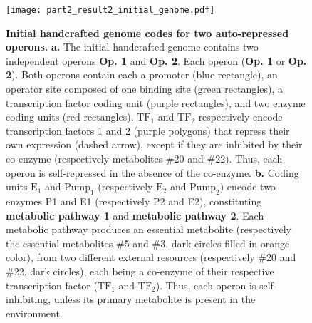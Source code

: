 \begin{figure}
\centering
\texttt{[image: part2\_result2\_initial\_genome.pdf]}
\caption[Initial handcrafted genome codes for two auto-repressed operons.]
{\textbf{Initial handcrafted genome codes for two auto-repressed operons.}
\textbf{a.} The initial handcrafted genome contains two independent operons \textbf{Op. 1} and \textbf{Op. 2}. Each operon (\textbf{Op. 1} or \textbf{Op. 2}). Both operons contain each a promoter (blue rectangle), an operator site composed of one binding site (green rectangles), a transcription factor coding unit (purple rectangles), and two enzyme coding units (red rectangles). $\text{TF}_1$ and $\text{TF}_2$ respectively encode transcription factors 1 and 2 (purple polygons) that repress their own expression (dashed arrow), except if they are inhibited by their co-enzyme (respectively metabolites \#20 and \#22). Thus, each operon is self-repressed in the absence of the co-enzyme.
\textbf{b.} Coding units $\text{E}_1$ and $\text{Pump}_1$ (respectively $\text{E}_2$ and $\text{Pump}_2$) encode two enzymes P1 and E1 (respectively P2 and E2), constituting \textbf{metabolic pathway 1} and \textbf{metabolic pathway 2}. Each metabolic pathway produces an essential metabolite (respectively the essential metabolites \#5 and \#3, dark circles filled in orange color), from two different external resources (respectively \#20 and \#22, dark circles), each being a co-enzyme of their respective transcription factor ($\text{TF}_1$ and $\text{TF}_2$). Thus, each operon is self-inhibiting, unless its primary metabolite is present in the environment.
}
\label{fig:part2:second_result:initial_genome}
\end{figure}

